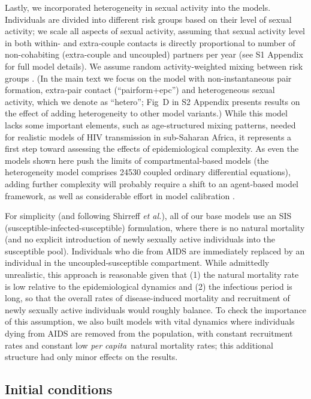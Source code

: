 \documentclass[10pt,letterpaper]{article}
\renewcommand{\figurename}{Fig}
\newcommand{\etal}{\textit{et al.}}
\newcommand{\percap}{\emph{per capita}}
\begin{document}
Lastly, we incorporated heterogeneity in sexual activity into the models. Individuals are divided into different risk groups based on their level of sexual activity; we scale all aspects of sexual activity, assuming that sexual activity level in both within- and extra-couple contacts is directly proportional to number of non-cohabiting (extra-couple and uncoupled) partners per year \cite{omori2015dynamics} (see S1 Appendix for full model details). We assume random activity-weighted mixing between risk groups \cite{may_transmission_1988}. 
(In the main text we focus on the model with non-instantaneous pair formation, extra-pair contact (``pairform+epc'') and heterogeneous sexual activity, which we denote as ``hetero''; \figurename~D in S2 Appendix presents results on the effect of adding heterogeneity to other model variants.)
While this model lacks some 
important elements, such as age-structured mixing patterns, needed for realistic models of HIV transmission in sub-Saharan Africa, it represents a first step toward assessing the effects of epidemiological complexity. As even the models shown here push the limits of compartmental-based models (the heterogeneity model comprises 24530 coupled ordinary differential equations), adding further complexity will probably require a shift to an agent-based model framework, as well as considerable effort in model calibration \cite{herbeck_hiv_2014,delva_connecting_2016,blanquart_transmission_virulence_2016}.

For simplicity (and following
Shirreff \etal), all of our base models use an SIS (susceptible-infected-susceptible) formulation, where 
there is no natural mortality (and no explicit introduction of newly sexually active individuals into
the susceptible pool). Individuals
who die from AIDS are immediately replaced by an individual in the uncoupled-susceptible compartment.
While admittedly unrealistic, this approach is reasonable given that (1) the natural mortality rate is low relative to
the epidemiological dynamics and (2) the infectious period is long, so that the overall rates of
disease-induced mortality and recruitment of newly sexually active individuals would roughly
balance. To check the importance of this assumption,
we also built models with vital dynamics where individuals dying from AIDS
are removed from the population, with constant recruitment rates and constant low
\percap\ natural mortality rates; this additional structure had only minor effects on
the results.

\subsection*{Initial conditions}
\end{document}
